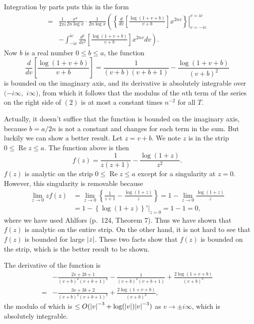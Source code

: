 \documentclass{note}
\numberwithin{equation}{chapter}
\newcommand{\re}{\operatorname{Re}}
\begin{document}
\begin{quotebar}
    Integration by parts puts this in the form
    \begin{align*}
        = & \frac{1}{2\pi i} \frac{x^a}{2n \log x} \cdot \frac{1}{2n \log x}
        \left( \left.\left\{ \frac{d}{dv} \left[ \frac{\log(1 + v + b)}{v + b}
        \right] x^{2nv} \right\}\right|_{v = -ic}^{v = ic} \right.           \\
          & \left. - \int_{-ic}^{ic} \frac{d^2}{dv^2} \left[
            \frac{\log(1 + v + b)}{v + b} \right] x^{2nv} dv \right).
    \end{align*}
    Now $b$ is a real number $0 \leq b \leq a$, the function
    \begin{equation*}
        \frac{d}{dv} \left[ \frac{\log(1 + v + b)}{v + b} \right] = \frac{1}{(v + b)(v
            + b + 1)} - \frac{\log(1 + v + b)}{(v + b)^2}
    \end{equation*}
    is bounded on the imaginary axis, and its derivative is absolutely integrable
    over $(-i\infty,$ $i\infty)$, from which it follows that the modulus of the
    $n$th term of the series on the right side of $(2)$ is at most a constant times
    $n^{-2}$ for all $T$.
\end{quotebar}

Actually, it doesn't suffice that the function is bounded on the imaginary
axis, because $b = a/2n$ is not a constant and changes for each term in the
sum. But luckily we can show a better result. Let $z = v + b$. We note $z$ is
in the strip $0 \leq \re z \le a$. The function above is then
\begin{equation*}
    f(z) = \frac{1}{z(z + 1)} - \frac{\log(1 + z)}{z^2}.
\end{equation*}
$f(z)$ is analytic on the strip $0 \leq \re z \le a$ except for a singularity
at $z = 0$. However, this singularity is removable because
\begin{align*}
    \lim_{z \to 0} zf(z)
     & = \lim_{z \to 0} \left\{ \frac{1}{z + 1} - \frac{\log(1 + z)}{z}
    \right\} = 1 - \lim_{z \to 0} \frac{\log(1 + z)}{z}                 \\
     & = 1 - \left\{\log(1+z)\right\}'|_{z = 0} = 1 - 1 = 0,
\end{align*}
where we have used Ahlfors (p.~124, Theorem 7). Thus we have shown that $f(z)$
is analytic on the entire strip. On the other hand, it is not hard to see that
$f(z)$ is bounded for large $\abs{z}$. These two facts show that $f(z)$ is
bounded on the strip, which is the better result to be shown.

The derivative of the function is
\begin{align*}
      & - \frac{2v + 2b + 1}{(v + b)^2(v + b + 1)^2}
    - \frac{1}{(v + b)^2 (v + b + 1)} + \frac{2\log(1 + v + b)}{(v + b)^3} \\
    = & - \frac{3v + 3b + 2}{(v + b)^2(v + b + 1)^2}
    + \frac{2\log(1 + v + b)}{(v + b)^3},
\end{align*}
the modulo of which is $\leq O(\abs{v}^{-3} + \log\prn{\abs{v}}\abs{v}^{-3})$
as $v \to \pm i\infty$, which is absolutely integrable.
\end{document}
